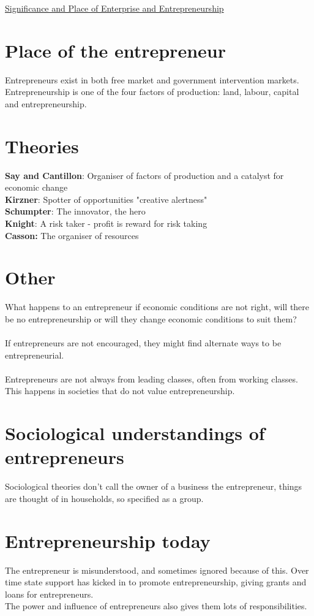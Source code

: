 \documentclass{article}[18pt]
\begin{document}
\begin{center}
\underline{\huge Significance and Place of Enterprise and Entrepreneurship}
\end{center}
\section{Place of the entrepreneur}
Entrepreneurs exist in both free market and government intervention markets. Entrepreneurship is one of the four factors of production: land, labour, capital and entrepreneurship.
\section{Theories}
\textbf{Say and Cantillon}: Organiser of factors of production and a catalyst for economic change\\
\textbf{Kirzner}: Spotter of opportunities "creative alertness"\\
\textbf{Schumpter}: The innovator, the hero\\
\textbf{Knight}: A risk taker - profit is reward for risk taking\\
\textbf{Casson:} The organiser of resources
\section{Other}
What happens to an entrepreneur if economic conditions are not right, will there be no entrepreneurship or will they change economic conditions to suit them?\\
\\
If entrepreneurs are not encouraged, they might find alternate ways to be entrepreneurial.\\
\\
Entrepreneurs are not always from leading classes, often from working classes. This happens in societies that do not value entrepreneurship. 
\section{Sociological understandings of entrepreneurs}
Sociological theories don't call the owner of a business the entrepreneur, things are thought of in households, so specified as a group. 
\section{Entrepreneurship today}
The entrepreneur is misunderstood, and sometimes ignored because of this. Over time state support has kicked in to promote entrepreneurship, giving grants and loans for entrepreneurs.\\
The power and influence of entrepreneurs also gives them lots of responsibilities.
\end{document}
